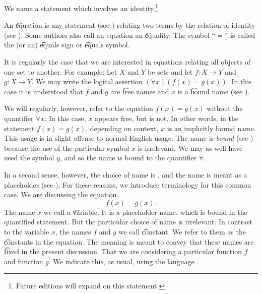 

We name a statement which involves an identity.\footnote{Future editions will expand on this statement.}


An \t{equation} is any statement (see ) relating two terms by the relation of identity (see ).
Some authors also call an equation an \t{equality}.
The symbol ``$=$'' is called the (or an) \t{equals sign} or \t{equals symbol}.


It is regularly the case that we are interested in equations relating all objects of one set to another.
For example:
Let $X$ and $Y$ be sets and let $f: X \to Y$ and $g: X \to Y$.
We may write the logical assertion $(\forall x)(f(x) = g(x))$.
In this case it is understood that $f$ and $g$ are \t{free} names and $x$ is a \t{bound} name (see ).

We will regularly, however, refer to the equation $f(x) = g(x)$ without the quantifier $\forall x$.
In this case, $x$ appears free, but is not.
In other words, in the statement $f(x) = g(x)$, depending on context, $x$ is an implicitly bound name.
This usage is in slight offense to normal English usage.
The name is \textit{bound} (see ) because the use of the particular symbol $x$ is irrelevant.
We may as well have used the symbol $y$, and so the name is bound to the quantifier $\forall$.

In a second sense, however, the choice of name is , and the name is meant as a placeholder (see ).
For these reasons, we introduce terminology for this common case.
We are discussing the equation
\[
  f(x) = g(x).
\]
The name $x$ we call a \t{variable}.
It is a placeholder name, which is bound in the quantified statement.
But the particular choice of name is irrelevant.
In contrast to the variable $x$, the names $f$ and $g$ we call \t{constant}.
We refer to them as the \t{constants} in the equation.
The meaning is meant to convey that these names are \t{fixed} in the present discussion.
That we are considering a particular function $f$ and function $g$.
We indicate this, as usual, using the language .
